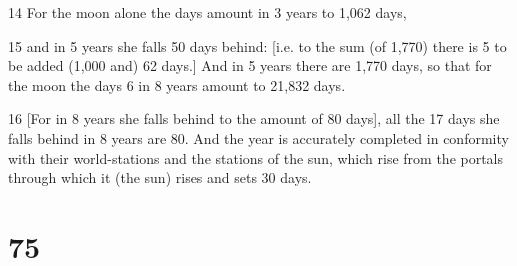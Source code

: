 \par 14 For the moon alone the days amount in 3 years to 1,062 days,
\par 15 and in 5 years she falls 50 days behind: [i.e. to the sum (of 1,770) there is 5 to be added (1,000 and) 62 days.] And in 5 years there are 1,770 days, so that for the moon the days 6 in 8 years amount to 21,832 days.
\par 16 [For in 8 years she falls behind to the amount of 80 days], all the 17 days she falls behind in 8 years are 80. And the year is accurately completed in conformity with their world-stations and the stations of the sun, which rise from the portals through which it (the sun) rises and sets 30 days.

\chapter{75}

